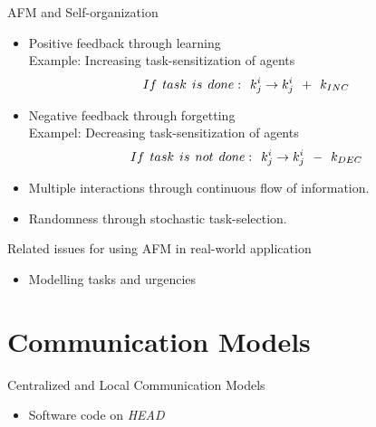 \documentclass{beamer}
\begin{document}
\begin{frame}[t]{AFM and Self-organization}
  \begin{itemize}
    \item \alert{Positive feedback} through learning\\ Example: Increasing task-sensitization of agents
\begin{equation}
 If\hspace*{0.15cm}task\hspace*{0.15cm}is\hspace*{0.15cm}done:\hspace*{0.15cm}  k^i_j \rightarrow   k^i_j \hspace*{0.15cm} + \hspace*{0.15cm} k_{INC}
\label{eqn:k-inc}
\end{equation} 
    \item \alert{Negative feedback} through forgetting\\ Exampel: Decreasing task-sensitization of agents
\begin{equation}
 If\hspace*{0.15cm}task\hspace*{0.15cm}is\hspace*{0.15cm}not\hspace*{0.15cm}done:\hspace*{0.15cm}  k^i_j \rightarrow   k^i_j \hspace*{0.15cm} - \hspace*{0.15cm} k_{DEC}
\label{eqn:k-dec}
\end{equation}   	
	\item \alert{Multiple interactions} through continuous flow of information.
	
	\item \alert{Randomness} through stochastic task-selection.
    \end{itemize}
\end{frame}
\begin{frame}[t]{Related issues for using AFM in real-world application}
  \begin{itemize}
    \item \alert{Modelling tasks and urgencies}
    \end{itemize}
\end{frame}
\section{Communication Models}
\begin{frame}[t]{Centralized and Local Communication Models}
  \begin{itemize}
    \item \alert{Software code on {\em HEAD}}
    \end{itemize}
\end{frame}
\end{document}
